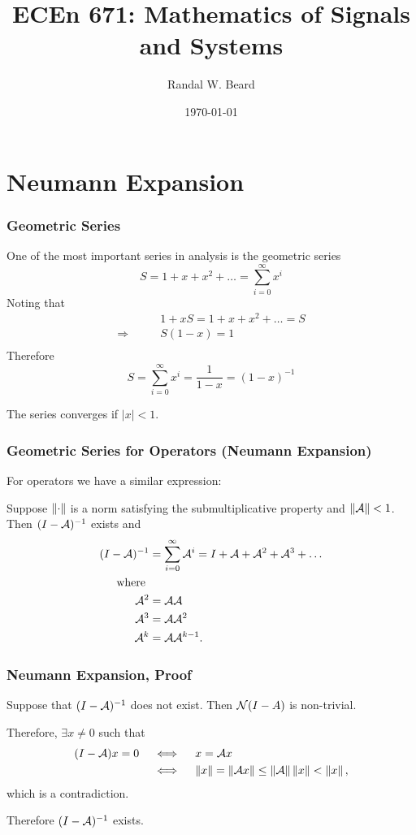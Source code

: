 \documentclass{beamer}
\title{ECEn 671: Mathematics of Signals and Systems}
\author{Randal W. Beard}
\institute{Brigham Young University}
\date{\today}
\begin{document}
\begin{frame}
	\titlepage
\end{frame}



\section{Neumann Expansion}
\frame{\sectionpage}

\begin{frame}\frametitle{Geometric Series}
	One of the most important series in analysis is the geometric series
	\[ 
	S = 1 + x + x^2 + \ldots = \sum_{i=0}^{\infty}x^i 
	\]
	Noting that 
	\begin{align*}
		& 1 + xS = 1 + x + x^2 + \ldots = S \\
		\Rightarrow \qquad & S(1-x) = 1 \\
	\end{align*}
	Therefore 
	\[
	S = \sum_{i=0}^{\infty} x^i = \frac{1}{1-x} = (1-x)^{-1} 
	\]

	\vfill
	
	The series converges if $|x| < 1$.
\end{frame}

\begin{frame}\frametitle{Geometric Series for Operators (Neumann Expansion)}
	For operators we have a similar expression:
	\begin{theorem}
	Suppose $\left\| \cdot \right\|$ is a norm satisfying the submultiplicative property and $\left\|\mathcal{A}\right\| < 1$.  Then $(I-\mathcal{A})^{-1}$ exists and
	\begin{align*}
		(I-\mathcal{A})^{-1} &= \sum_{i=0}^{\infty} \mathcal{A}^i 
			= I + \mathcal{A} + \mathcal{A}^2 + \mathcal{A}^3 + \ldots\\
		\text{ where } & \\
		\mathcal{A}^2 &= \mathcal{A}\mathcal{A} \\
		\mathcal{A}^3 &= \mathcal{A}\mathcal{A}^2 \\
		\mathcal{A}^k &= \mathcal{A}\mathcal{A}^{k-1}.
	\end{align*}
\end{theorem}
\end{frame}

\begin{frame}\frametitle{Neumann Expansion, Proof}
	Suppose that $(I-\mathcal{A})^{-1}$ does not exist.  Then $\mathcal{N}(I-A)$ is non-trivial.
	
	Therefore, $\exists x \neq 0$ such that 
	\begin{align*}
	(I-\mathcal{A})x = 0 \quad &\iff \quad x = \mathcal{A} x \\
	&\iff \quad \left\| x \right\| = \left\|\mathcal{A} x \right\| \leq \left\| \mathcal{A} \right\|\left\| x \right\| < \left\| x \right\|,
	\end{align*}
	which is a contradiction.  
	
	\vfill
	
	Therefore $(I-\mathcal{A})^{-1}$ exists.
\end{frame}
\end{document}
